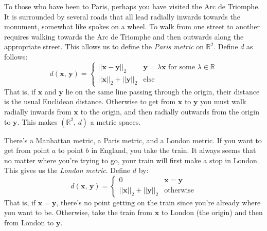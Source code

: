 \documentclass{article}
\theoremstyle{plain}
\theoremstyle{normal}
\newenvironment{example}{%
    \pushQED{\qed}\renewcommand{\qedsymbol}{$\blacksquare$}\examplex%
}{%
    \popQED\endexamplex%
}
\begin{document}
        \begin{example}
            To those who have been to Paris, perhaps you have visited the
            Arc de Triomphe. It is surrounded by several roads that all lead
            radially inwards towards the monument, somewhat like spokes on
            a wheel. To walk from one street to another requires walking towards
            the Arc de Triomphe and then outwards along the appropriate street.
            This allows us to define the \textit{Paris metric} on
            $\mathbb{R}^{2}$. Define $d$ as follows:
            \begin{equation}
                d(\mathbf{x},\,\mathbf{y})=
                \begin{cases}
                    ||\mathbf{x}-\mathbf{y}||_{2}&
                        \mathbf{y}=\lambda\mathbf{x}\textrm{ for some }
                        \lambda\in\mathbb{R}\\
                    ||\mathbf{x}||_{2}+||\mathbf{y}||_{2}&
                        \textrm{else}
                \end{cases}
            \end{equation}
            That is, if $\mathbf{x}$ and $\mathbf{y}$ lie on the same line
            passing through the origin, their distance is the usual Euclidean
            distance. Otherwise to get from $\mathbf{x}$ to $\mathbf{y}$ you
            must walk radially inwards from $\mathbf{x}$ to the origin, and
            then radially outwards from the origin to $\mathbf{y}$. This makes
            $(\mathbb{R}^{2},\,d)$ a metric spaces.
        \end{example}
        \begin{example}
            There's a Manhattan metric, a Paris metric, and a London metric.
            If you want to get from point $a$ to point $b$ in England, you take
            the train. It always seems that no matter where you're trying to
            go, your train will first make a stop in London. This gives us the
            \textit{London metric}. Define $d$ by:
            \begin{equation}
                d(\mathbf{x},\,\mathbf{y})=
                \begin{cases}
                    0&\mathbf{x}=\mathbf{y}\\
                    ||\mathbf{x}||_{2}+||\mathbf{y}||_{2}&\textrm{otherwise}
                \end{cases}
            \end{equation}
            That is, if $\mathbf{x}=\mathbf{y}$, there's no point getting on
            the train since you're already where you want to be. Otherwise,
            take the train from $\mathbf{x}$ to London (the origin) and then
            from London to $\mathbf{y}$.
        \end{example}
\end{document}
